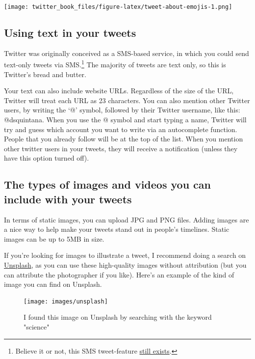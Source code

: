 \documentclass[
]{book}
\begin{document}
\texttt{[image: twitter\_book\_files/figure-latex/tweet-about-emojis-1.png]}

\hypertarget{using-text-in-your-tweets}{%
\subsection{Using text in your tweets}\label{using-text-in-your-tweets}}

Twitter was originally conceived as a SMS-based service, in which you could send text-only tweets via SMS.\footnote{Believe it or not, this SMS tweet-feature \href{https://help.twitter.com/en/using-twitter/twitter-sms}{still exists}.} The majority of tweets are text only, so this is Twitter's bread and butter.

Your text can also include website URLs. Regardless of the size of the URL, Twitter will treat each URL as 23 characters. You can also mention other Twitter users, by writing the `@' symbol, followed by their Twitter username, like this: @dsquintana. When you use the @ symbol and start typing a name, Twitter will try and guess which account you want to write via an autocomplete function. People that you already follow will be at the top of the list. When you mention other twitter users in your tweets, they will receive a notification (unless they have this option turned off).

\hypertarget{the-types-of-images-and-videos-you-can-include-with-your-tweets}{%
\subsection{The types of images and videos you can include with your tweets}\label{the-types-of-images-and-videos-you-can-include-with-your-tweets}}

In terms of static images, you can upload JPG and PNG files. Adding images are a nice way to help make your tweets stand out in people's timelines. Static images can be up to 5MB in size.

If you're looking for images to illustrate a tweet, I recommend doing a search on \href{https://unsplash.com/}{Unsplash}, as you can use these high-quality images without attribution (but you can attribute the photographer if you like). Here's an example of the kind of image you can find on Unsplash.

\begin{figure}

\texttt{[image: images/unsplash]} \hfill{}

\caption{I found this image on Unsplash by searching with the keyword "science"}\label{fig:unnamed-chunk-6}
\end{figure}
\end{document}
